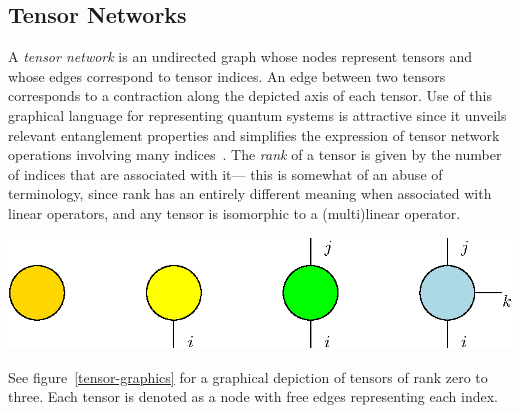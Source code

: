 \documentclass[12pt]{article}
\newenvironment{Figure}
  {\par\medskip\noindent\minipage{\linewidth}}
  {\endminipage\par\medskip}
\begin{document}
\begin{multicols}{2}
	\subsection{Tensor Networks}
	A \textit{tensor network} is an undirected graph whose nodes
	represent tensors and whose edges correspond to tensor indices. An
	edge between two tensors corresponds to a contraction along the
	depicted axis of each tensor. Use of this graphical language for
	representing quantum systems is attractive since it unveils relevant
	entanglement properties and simplifies the expression of tensor network operations involving many indices~\cite{TnIntro}. The
	\textit{rank} of a tensor is given by the number of indices that are associated with it--- this is somewhat of an abuse of terminology, since rank has an entirely different meaning when associated with linear operators, and any tensor is isomorphic to a (multi)linear operator.
	\begin{Figure}
		\center\includegraphics[width=.9\textwidth]{./Figures/tensors.eps}
		\label{tensor-graphics}
	\end{Figure}
	See figure~\ref{tensor-graphics} for a graphical depiction of
	tensors of rank zero to three. Each tensor is denoted as a node with
	free edges representing each index.


\end{multicols}
\end{document}
